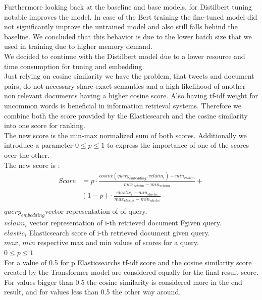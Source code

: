 \documentclass{article}
\begin{document}
Furthermore looking back at the baseline and base models, for Distilbert tuning notable improves the model. In case of the Bert training the fine-tuned model did not significantly improve the untrained model and also still falls behind the baseline.
We concluded that this behavior is due to the lower batch size that we used in training due to higher memory demand.\\
We decided to continue with the Distilbert model due to a lower resource and time consumption for tuning and embedding.\\
Just relying on cosine similarity we have the problem, that tweets and document pairs, do not necessary share exact semantics and a high likelihood of another non relevant documents having a higher cosine score.
Also having tf-idf weight for uncommon words is beneficial in information retrieval systems.
Therefore we combine both the score provided by the Elasticsearch and the cosine similarity into one score for ranking.\\
The new score is the min-max normalized sum of both scores.
Additionally we introduce a parameter $0\leqslant p \leqslant1$ to express the importance of one of the scores over the other.\\
The new score is :
\begin{equation*}
\begin{aligned}
Score & = p \cdot \frac{cosine(query_{embedding}, vclaim_i) - min_{vclaim}}{max_{vclaim} - min_{vclaim}} + \\
& (1-p) \cdot \frac{elastic_i - min_{elastic}}{max_{elastic} - min_{elastic}}\\
\end{aligned}
\end{equation*}
$query_{embedding}$\quad vector representation of of query.\\
$vclaim_i$ \quad vector representation of i-th retrieved document Fgiven query.\\
$elastic_i$ \quad Elasticsearch score of i-th retrieved document given query.\\
$max,\,min$ \quad respective max and min values of scores for a query.\\ 
$0\leqslant p \leqslant1$ \\
For a value of 0.5 for p Elasticsearchs tf-idf score and the cosine similarity score created by the Transformer model are considered equally for the final result score.
For values bigger than 0.5 the cosine similarity is considered more in the end result, and for values less than 0.5 the other way around.\\
\end{document}
